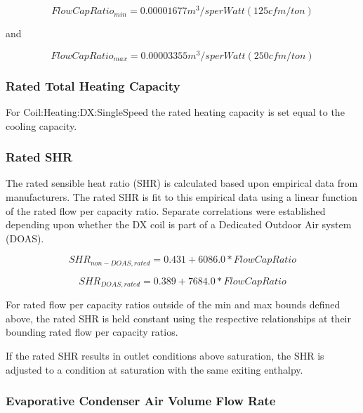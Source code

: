 \begin{equation}
\textit{FlowCapRatio\(_{min}\)} = 0.00001677 m^{3}/s per Watt (125 cfm/ton)
\end{equation}

and

\begin{equation}
\textit{FlowCapRatio\(_{max}\)} = 0.00003355 m^{3}/s per Watt (250 cfm/ton)
\end{equation}

\subsubsection{Rated Total Heating Capacity}\label{rated-total-heating-capacity-2}

For Coil:Heating:DX:SingleSpeed the rated heating capacity is set equal to the cooling capacity.

\subsubsection{Rated SHR}\label{rated-shr}

The rated sensible heat ratio (SHR) is calculated based upon empirical data from manufacturers. The rated SHR is fit to this empirical data using a linear function of the rated flow per capacity ratio. Separate correlations were established depending upon whether the DX coil is part of a Dedicated Outdoor Air system (DOAS).

\begin{equation}
SHR_{non-DOAS,rated} = 0.431 + 6086.0 * FlowCapRatio
\end{equation}

\begin{equation}
SHR_{DOAS,rated} = 0.389 + 7684.0 * FlowCapRatio
\end{equation}

For rated flow per capacity ratios outside of the min and max bounds defined above, the rated SHR is held constant using the respective relationships at their bounding rated flow per capacity ratios.

If the rated SHR results in outlet conditions above saturation, the SHR is adjusted to a condition at saturation with the same exiting enthalpy.

\subsubsection{Evaporative Condenser Air Volume Flow Rate}\label{evaporative-condenser-air-volume-flow-rate}

